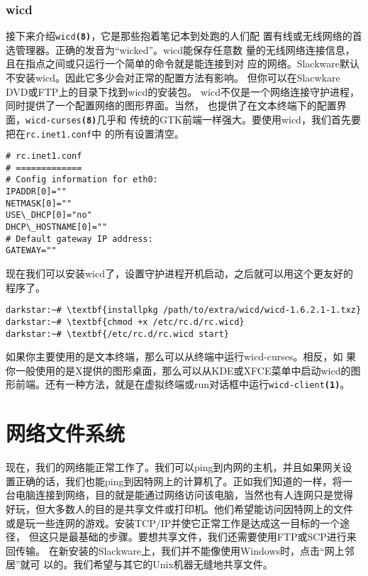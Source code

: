 \subsubsection{wicd}
\label{sec:networkConfiguration:wireless:details:wicd}
接下来介绍\texttt{wicd\textbf{(8)}}，它是那些抱着笔记本到处跑的人们配
置有线或无线网络的首选管理器。正确的发音为``wicked''。wicd能保存任意数
量的无线网络连接信息，且在指点之间或只运行一个简单的命令就是能连接到对
应的网络。Slackware默认不安装wicd。因此它多少会对正常的配置方法有影响。
但你可以在Slacwkare DVD或FTP上的目录下找到wicd的安装包。
wicd不仅是一个网络连接守护进程，同时提供了一个配置网络的图形界面。当然，
也提供了在文本终端下的配置界面，\texttt{wicd-curses\textbf{(8)}}几乎和
传统的GTK前端一样强大。要使用wicd，我们首先要把在\texttt{rc.inet1.conf}中
的所有设置清空。
\begin{Verbatim}[frame=single,commandchars=\\\{\}]
# rc.inet1.conf
# =============
# Config information for eth0:
IPADDR[0]=""
NETMASK[0]=""
USE\_DHCP[0]="no"
DHCP\_HOSTNAME[0]=""
# Default gateway IP address:
GATEWAY=""
\end{Verbatim}
现在我们可以安装wicd了，设置守护进程开机启动，之后就可以用这个更友好的
程序了。
\begin{Verbatim}[frame=single,commandchars=\\\{\}]
darkstar:~# \textbf{installpkg /path/to/extra/wicd/wicd-1.6.2.1-1.txz}
darkstar:~# \textbf{chmod +x /etc/rc.d/rc.wicd}
darkstar:~# \textbf{/etc/rc.d/rc.wicd start}
\end{Verbatim}
如果你主要使用的是文本终端，那么可以从终端中运行wicd-curses。相反，如
果你一般使用的是X提供的图形桌面，那么可以从KDE或XFCE菜单中启动wicd的图
形前端。还有一种方法，就是在虚拟终端或run对话框中运行\texttt{wicd-client\textbf{(1)}}。


\section{网络文件系统}
\label{sec:networkConfiguration:networkFileSystem}
现在，我们的网络能正常工作了。我们可以ping到内网的主机，并且如果网关设
置正确的话，我们也能ping到因特网上的计算机了。正如我们知道的一样，将一
台电脑连接到网络，目的就是能通过网络访问该电脑，当然也有人连网只是觉得
好玩，但大多数人的目的是共享文件或打印机。他们希望能访问因特网上的文件
或是玩一些连网的游戏。安装TCP/IP并使它正常工作是达成这一目标的一个途径，
但这只是最基础的步骤。要想共享文件，我们还需要使用FTP或SCP进行来回传输。
在新安装的Slackware上，我们并不能像使用Windows时，点击“网上邻居”就可
以的。我们希望与其它的Unix机器无缝地共享文件。

